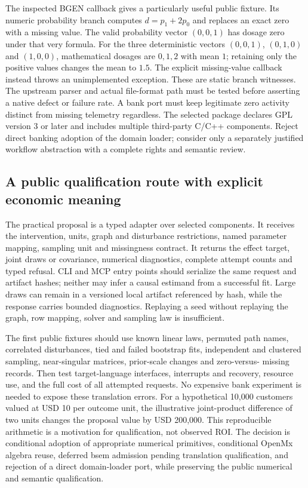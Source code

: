 The inspected BGEN callback gives a particularly useful public fixture. Its
numeric probability branch computes $d=p_1+2p_0$ and replaces an exact zero
with a missing value. The valid probability vector $(0,0,1)$ has dosage zero
under that very formula. For the three deterministic vectors $(0,0,1)$,
$(0,1,0)$ and $(1,0,0)$, mathematical dosages are $0,1,2$ with mean $1$;
retaining only the positive values changes the mean to $1.5$. The explicit
missing-value callback instead throws an unimplemented exception. These are
static branch witnesses. The upstream parser and actual file-format path must
be tested before asserting a native defect or failure rate. A bank port must
keep legitimate zero activity distinct from missing telemetry regardless.
The selected package declares GPL version 3 or later and includes multiple
third-party C/C++ components. Reject direct banking adoption of the domain
loader; consider only a separately justified workflow abstraction with a
complete rights and semantic review.~\citep{exec25_cmed_gwsem,exec25_cmed_choice}

\subsection{A public qualification route with explicit economic meaning}

The practical proposal is a typed adapter over selected components. It receives
the intervention, units, graph and disturbance restrictions, named parameter
mapping, sampling unit and missingness contract. It returns the effect target,
joint draws or covariance, numerical diagnostics, complete attempt counts and
typed refusal. CLI and MCP entry points should serialize the same request and
artifact hashes; neither may infer a causal estimand from a successful fit.
Large draws can remain in a versioned local artifact referenced by hash, while
the response carries bounded diagnostics. Replaying a seed without replaying
the graph, row mapping, solver and sampling law is insufficient.

The first public fixtures should use known linear laws, permuted path names,
correlated disturbances, tied and failed bootstrap fits, independent and
clustered sampling, near-singular matrices, prior-scale changes and zero-versus-
missing records. Then test target-language interfaces, interrupts and recovery,
resource use, and the full cost of all attempted requests. No expensive bank
experiment is needed to expose these translation errors. For a hypothetical
10,000 customers valued at USD 10 per outcome unit, the illustrative joint-product
difference of two units changes the proposal value by USD 200,000. This
reproducible arithmetic is a motivation for qualification, not observed ROI.
The decision is conditional adoption of appropriate numerical primitives,
conditional OpenMx algebra reuse, deferred bsem admission pending translation
qualification, and rejection of a direct domain-loader port, while preserving
the public numerical and semantic qualification.~\citep{exec25_cmed_choice}


